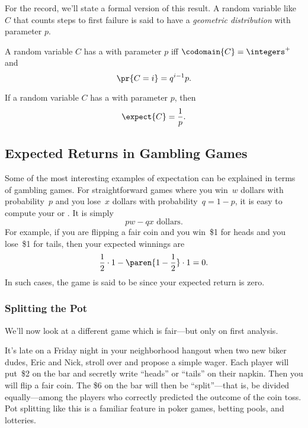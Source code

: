 For the record, we'll state a formal version of this result.  A random
variable like $C$ that counts steps to first failure is said to have a
\emph{geometric distribution} with parameter $p$.
\begin{definition}\label{def:geometric_distribution}
A random variable $C$ has a  with
parameter $p$ iff $\codomain{C} = \integers^+$ and
\[
\pr{C=i} = q^{i-1}p.
\]
\end{definition}

\begin{lemma}\label{lem:exp_time_to_fail}
If a random variable $C$ has a  with
parameter $p$, then
\begin{equation}\label{exp_time_to_fail}
    \expect{C} = \frac{1}{p}.
\end{equation}
\end{lemma}

\subsection{Expected Returns in Gambling Games}

Some of the most interesting examples of expectation can be explained
in terms of gambling games.  For straightforward games where you
win~$w$ dollars with probability~$p$ and you lose~$x$ dollars with
probability~$q = 1 - p$, it is easy to compute your 
or .  It is simply
\[
    p w - q x \text{ dollars}.
\]
For example, if you are flipping a fair coin and you win~\$1 for heads
and you lose~\$1 for tails, then your expected winnings are
\[
    \frac{1}{2} \cdot 1 - \paren{1 - \frac{1}{2}} \cdot 1 = 0.
\]
In such cases, the game is said to be  since your expected
return is zero.

\subsubsection{Splitting the Pot}

We'll now look at a different game which is fair---but only on first
analysis.

It's late on a Friday night in your neighborhood hangout when two new
biker dudes, Eric and Nick, stroll over and propose a simple wager.
Each player will put~\$2 on the bar and secretly write ``heads'' or
``tails'' on their napkin.  Then you will flip a fair coin.
The \$6 on the bar will then be ``split''---that is, be divided
equally---among the players who correctly predicted the outcome of
the coin toss.  Pot splitting like this is a familiar feature in poker
games, betting pools, and lotteries.

